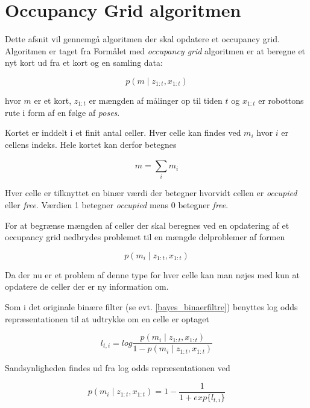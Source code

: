 \section{Occupancy Grid algoritmen}
Dette afsnit vil gennemgå algoritmen der skal opdatere et occupancy grid.
Algoritmen er taget fra \cite[p.~xxx]{probabilisticRobotics}
Formålet med \textit{occupancy grid} algoritmen er at beregne	et nyt kort ud fra et kort og en samling data:

\begin{equation}
p(m \mid z_{1:t}, x_{1:t})
\end{equation}

hvor $m$ er et kort, $ z_{1:t} $ er mængden af målinger op til tiden $t$ og $ x_{1:t} $ er robottons rute i form af en følge af \textit{poses}.

Kortet er inddelt i et finit antal celler.
Hver celle kan findes ved $ m_i $ hvor $i$ er cellens indeks. 
Hele kortet kan derfor betegnes

\begin{equation}
m = \sum_{i}^{} m_i 
\end{equation}

Hver celle er tilknyttet en binær værdi der betegner hvorvidt cellen er \textit{occupied} eller \textit{free}.
Værdien 1 betegner \textit{occupied} mens 0 betegner \textit{free}.

For at begrænse mængden af celler der skal beregnes ved en opdatering af et occupancy grid nedbrydes problemet til en mængde delproblemer af formen

\begin{equation}
p(m_i \mid z_{1:t}, x_{1:t})
\end{equation} 

Da der nu er et problem af denne type for hver celle kan man nøjes med kun at opdatere de celler der er ny information om.

Som i det originale binære filter (se evt. \cref{bayes_binaerfiltre}) benyttes log odds repræsentationen til at udtrykke om en celle er optaget

\begin{equation}
l_{t,i} = log{ \frac{p(m_i \mid z_{1:t}, x_{1:t})}{1 - p(m_i \mid z_{1:t}, x_{1:t})}} 
\end{equation} 

Sandsynligheden findes ud fra log odds repræsentationen ved

\begin{equation}
p(m_i \mid z_{1:t}, x_{1:t}) = 1 - \frac{1}{1 + exp \{ l_{t,i} \} }
\end{equation} 

